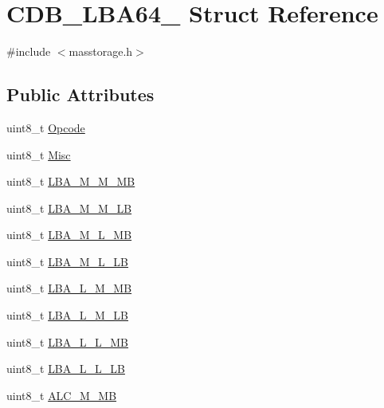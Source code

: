 \hypertarget{struct_c_d_b___l_b_a64__16}{\section{\-C\-D\-B\-\_\-\-L\-B\-A64\-\_ \-Struct \-Reference}
\label{struct_c_d_b___l_b_a64__16}
}


{\ttfamily \#include $<$masstorage.\-h$>$}

\subsection*{\-Public \-Attributes}
\begin{DoxyCompactItemize}
\item 
uint8\-\_\-t \hyperlink{struct_c_d_b___l_b_a64__16_a20868e9b945a51e146af8a31cad92977}{\-Opcode}
\item 
uint8\-\_\-t \hyperlink{struct_c_d_b___l_b_a64__16_a5f3b9efa508e9e3d79a70414ea5c74ff}{\-Misc}
\item 
uint8\-\_\-t \hyperlink{struct_c_d_b___l_b_a64__16_a0d132ae68523608e5365f253072da224}{\-L\-B\-A\-\_\-\-M\-\_\-\-M\-\_\-\-M\-B}
\item 
uint8\-\_\-t \hyperlink{struct_c_d_b___l_b_a64__16_aed9c8595adf84a0fde2176afe2e45608}{\-L\-B\-A\-\_\-\-M\-\_\-\-M\-\_\-\-L\-B}
\item 
uint8\-\_\-t \hyperlink{struct_c_d_b___l_b_a64__16_a3e6a585296d7ae2e425604b1b1ba3113}{\-L\-B\-A\-\_\-\-M\-\_\-\-L\-\_\-\-M\-B}
\item 
uint8\-\_\-t \hyperlink{struct_c_d_b___l_b_a64__16_ad3fc14c1607698368df8704cc8d21562}{\-L\-B\-A\-\_\-\-M\-\_\-\-L\-\_\-\-L\-B}
\item 
uint8\-\_\-t \hyperlink{struct_c_d_b___l_b_a64__16_a84e73dddce6f0967367cbfaeb64bb01f}{\-L\-B\-A\-\_\-\-L\-\_\-\-M\-\_\-\-M\-B}
\item 
uint8\-\_\-t \hyperlink{struct_c_d_b___l_b_a64__16_a63cbcd1af4db45506a83c7ec603b44ea}{\-L\-B\-A\-\_\-\-L\-\_\-\-M\-\_\-\-L\-B}
\item 
uint8\-\_\-t \hyperlink{struct_c_d_b___l_b_a64__16_a43f9e4f510e12a6fcc5afd90f740f76e}{\-L\-B\-A\-\_\-\-L\-\_\-\-L\-\_\-\-M\-B}
\item 
uint8\-\_\-t \hyperlink{struct_c_d_b___l_b_a64__16_a275834d52785e9b72c4eb6b8c0a7d2e2}{\-L\-B\-A\-\_\-\-L\-\_\-\-L\-\_\-\-L\-B}
\item 
uint8\-\_\-t \hyperlink{struct_c_d_b___l_b_a64__16_a9cf979f1acbdc8e11b29b1f9aa81c2f3}{\-A\-L\-C\-\_\-\-M\-\_\-\-M\-B}

\end{DoxyCompactItemize}
